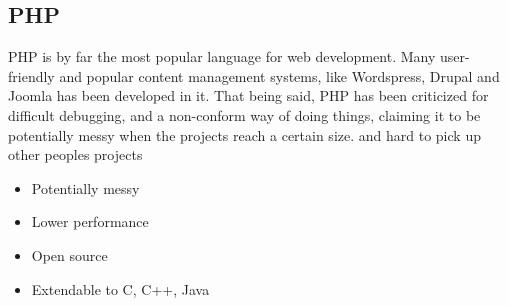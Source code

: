 \documentclass{report}
\begin{document}
\subsection{PHP}
PHP is by far the most popular language for web development\cite{website:php_python_ruby}. Many user-friendly and popular content management systems, like Wordspress, Drupal and Joomla has been developed in it. That being said, PHP has been criticized for difficult debugging, and a non-conform way of doing things, claiming it to be potentially messy when the projects reach a certain size. and hard to pick up other peoples projects\cite{website:}
\begin{itemize}
\item Potentially messy 
\item Lower performance
\item Open source
\item Extendable to C, C++, Java
\end{itemize}
\end{document}
